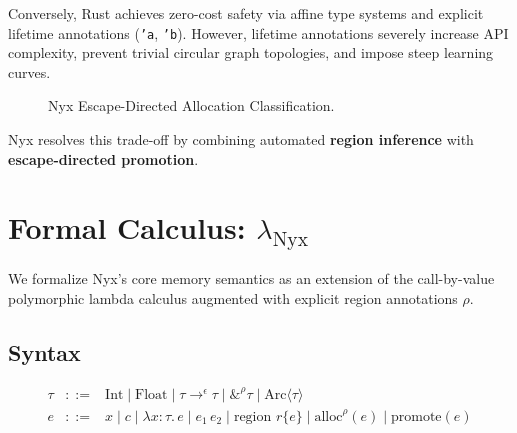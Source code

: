 \documentclass[sigplan,10pt,nonacm]{acmart}
\theoremstyle{definition}
\begin{document}
Conversely, Rust achieves zero-cost safety via affine type systems and explicit lifetime annotations (\texttt{'a}, \texttt{'b}). However, lifetime annotations severely increase API complexity, prevent trivial circular graph topologies, and impose steep learning curves.

\begin{figure}[h]
\centering
{}
\caption{Nyx Escape-Directed Allocation Classification.}
\label{fig:classification}
\end{figure}

Nyx resolves this trade-off by combining automated \textbf{region inference} with \textbf{escape-directed promotion}. 

\section{Formal Calculus: $\lambda_{\text{Nyx}}$}
We formalize Nyx's core memory semantics as an extension of the call-by-value polymorphic lambda calculus augmented with explicit region annotations $\rho$.

\subsection{Syntax}
\[
\begin{array}{rcl}
\tau & ::= & \text{Int} \mid \text{Float} \mid \tau \to^{\epsilon} \tau \mid \&^{\rho} \tau \mid \text{Arc}\langle\tau\rangle \\
e & ::= & x \mid c \mid \lambda x : \tau.\, e \mid e_1\, e_2 \mid \text{region } r \{ e \} \mid \text{alloc}^{\rho}(e) \mid \text{promote}(e)
\end{array}
\]
\end{document}
